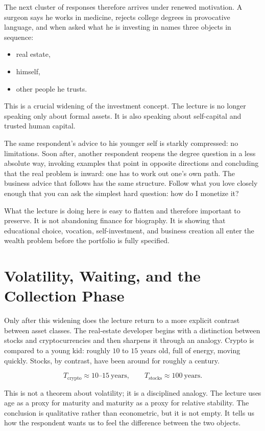 The next cluster of responses therefore arrives under renewed motivation. A surgeon says he works in medicine, rejects college degrees in provocative language, and when asked what he is investing in names three objects in sequence:
\begin{itemize}
\item real estate,
\item himself,
\item other people he trusts.
\end{itemize}
This is a crucial widening of the investment concept. The lecture is no longer speaking only about formal assets. It is also speaking about self-capital and trusted human capital.

The same respondent's advice to his younger self is starkly compressed: no limitations. Soon after, another respondent reopens the degree question in a less absolute way, invoking examples that point in opposite directions and concluding that the real problem is inward: one has to work out one's own path. The business advice that follows has the same structure. Follow what you love closely enough that you can ask the simplest hard question: how do I monetize it?

What the lecture is doing here is easy to flatten and therefore important to preserve. It is not abandoning finance for biography. It is showing that educational choice, vocation, self-investment, and business creation all enter the wealth problem before the portfolio is fully specified.

\section{Volatility, Waiting, and the Collection Phase}

Only after this widening does the lecture return to a more explicit contrast between asset classes. The real-estate developer begins with a distinction between stocks and cryptocurrencies and then sharpens it through an analogy. Crypto is compared to a young kid: roughly \(10\) to \(15\) years old, full of energy, moving quickly. Stocks, by contrast, have been around for roughly a century.

\begin{equation}
T_{\text{crypto}} \approx 10\text{--}15\ \text{years},
\qquad
T_{\text{stocks}} \approx 100\ \text{years}.
\end{equation}

This is not a theorem about volatility; it is a disciplined analogy. The lecture uses age as a proxy for maturity and maturity as a proxy for relative stability. The conclusion is qualitative rather than econometric, but it is not empty. It tells us how the respondent wants us to feel the difference between the two objects.

